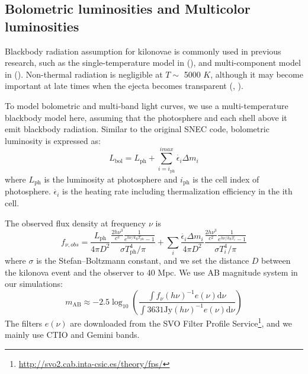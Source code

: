 \documentclass[fleqn,usenatbib]{mnras}
\begin{document}
    \subsection{Bolometric luminosities and Multicolor luminosities} 
    
    Blackbody radiation assumption for kilonovae is commonly used in previous research, such as the single-temperature model in (\cite{li1998transient}), and multi-component model in (\cite{villar2017combined}). Non-thermal radiation is negligible at $T \sim$ 5000 $K$, although it may become important at late times when the ejecta becomes transparent (\cite{kasen2013opacities},  \cite{tanaka2013radiative}). 
    
    To model bolometric and multi-band light curves, we use a multi-temperature blackbody model here, assuming that the photosphere and each shell above it emit blackbody radiation. Similar to the original SNEC code, bolometric luminosity is expressed as:
    \begin{equation}
        L_{\mathrm{bol}} =  L_{\mathrm{ph}} + \sum_{i=i_{\mathrm{ph}}}^{imax} \dot{\epsilon_i} \Delta m_i 
    \label{Lbol} 
    \end{equation}
    where $L_{\mathrm{ph}}$ is the luminosity at photosphere and $i_{\mathrm{ph}}$ is the cell index of photosphere. $\dot{\epsilon_i}$ is the heating rate including thermalization efficiency in the ith cell.  
    
    The observed flux density at frequency $\nu$ is
    \begin{equation}
       	f_{\nu,obs} = \frac{L_{\mathrm{ph}}}{4 \pi D^2} \frac{\frac{2h \nu^3}{c^2} \frac{1}{e^{h \nu /k_{\mathrm{B}} T_{\mathrm{ph}}}-1}}{\sigma T_{\mathrm{ph}}^4 / \pi}  + \sum_i \frac{\dot{ \epsilon_i} \Delta m_i}{4 \pi D^2} \frac{\frac{2h \nu^3}{c^2} \frac{1}{e^{h \nu /k_{\mathrm{B}} T_i}-1}}{\sigma T_i^4 / \pi} 
    \end{equation}
    where $\sigma$ is the Stefan–Boltzmann constant, and we set the distance $D$ between the kilonova event and the observer to 40 Mpc. We use AB magnitude system in our simulations:   
	\begin{equation}
    m_{\mathrm{AB}} \approx-2.5 \log _{10}\left(\frac{\int f_{\nu}(h \nu)^{-1} e(\nu) \mathrm{d} \nu}{\int 3631 \mathrm{Jy}(h \nu)^{-1} e(\nu) \mathrm{d} \nu}\right)
	\end{equation}
    The filters $e(\nu)$ are downloaded from the SVO Filter Profile Service\footnote{\label{foot:filters}\url{http://svo2.cab.inta-csic.es/theory/fps/}}, and we mainly use CTIO and Gemini bands.
\end{document}
